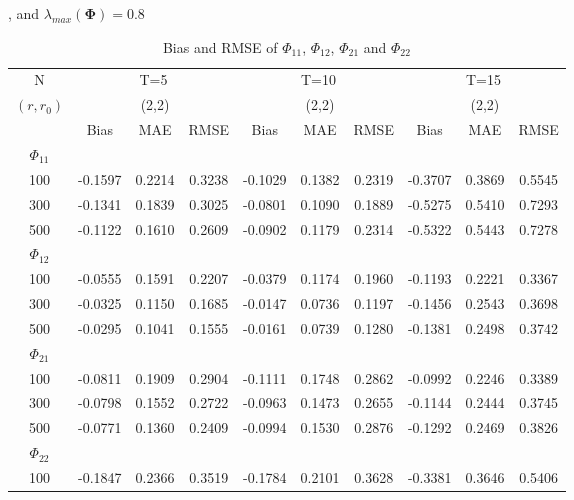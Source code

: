 \documentclass[12pt,a4paper,hyperref]{article}
\begin{document}
\begin{table}[H]
\caption{Bias and RMSE of $\Phi_{11}$, $\Phi_{12}$, $\Phi_{21}$ and $\Phi_{22}$} , and $\lambda_{max}(\boldsymbol{\Phi})=0.8$    \label{table1}
\centering
\tabcolsep=0.11cm
\begin{threeparttable}
\begin{tabular} {*{10}{c}}
\toprule
N& \multicolumn{3}{c}{T=5}&\multicolumn{3}{c}{T=10}&\multicolumn{3}{c}{T=15}\\
\cmidrule(lr){1-10}
$(r,r_{0})$ &   &(2,2)  &  &   &(2,2)  & &  &(2,2) & \\
\cmidrule(lr){1-4} \cmidrule(lr){5-7}\cmidrule(lr){8-10}
& \multicolumn{1}{c}{Bias} &\multicolumn{1}{c}{MAE}& \multicolumn{1}{c}{RMSE}&\multicolumn{1}{c}{Bias} &\multicolumn{1}{c}{MAE}& \multicolumn{1}{c}{RMSE}&\multicolumn{1}{c}{Bias}&\multicolumn{1}{c}{MAE} & \multicolumn{1}{c}{RMSE}\\
  \cmidrule(lr){2-4} \cmidrule(lr){5-7} \cmidrule(lr){8-10}
 $\Phi_{11}$\\
\cmidrule(lr){1-10}
 100& -0.1597& 0.2214& 0.3238&	-0.1029  &	0.1382& 0.2319& -0.3707&0.3869& 0.5545 \\
300& -0.1341& 0.1839& 0.3025&-0.0801	  &0.1090	&0.1889& -0.5275& 0.5410& 0.7293 \\
500& -0.1122& 0.1610&  0.2609&	-0.0902 &0.1179	&0.2314 &-0.5322 &0.5443 &0.7278	  \\
\cmidrule(lr){1-10}
$\Phi_{12}$\\
\cmidrule(lr){1-4}   \cmidrule(lr){5-7}   \cmidrule(lr){8-10}
  100& -0.0555 & 0.1591&0.2207 &-0.0379 &	0.1174&0.1960 & -0.1193& 0.2221& 0.3367  \\
300&  -0.0325& 0.1150&0.1685&	-0.0147 &0.0736	&0.1197	&-0.1456& 0.2543& 0.3698\\
500&-0.0295& 0.1041& 0.1555  &	-0.0161  &0.0739	& 0.1280&-0.1381 &0.2498 &	0.3742  \\
\cmidrule(lr){1-10}
$\Phi_{21}$\\
\cmidrule(lr){1-4}   \cmidrule(lr){5-7}   \cmidrule(lr){8-10}
 100&-0.0811 &0.1909& 0.2904&	-0.1111 &	0.1748& 0.2862& -0.0992& 0.2246&0.3389  \\
300& -0.0798  & 0.1552 &0.2722&	-0.0963 &	0.1473&	0.2655& -0.1144&0.2444 & 0.3745\\
500& -0.0771& 0.1360& 0.2409 &	-0.0994 &0.1530&0.2876 &-0.1292 &0.2469 &	0.3826 \\
\cmidrule(lr){1-10}
$\Phi_{22}$\\
\cmidrule(lr){1-4}   \cmidrule(lr){5-7}   \cmidrule(lr){8-10}
 100& -0.1847 & 0.2366&0.3519 &	 -0.1784&0.2101	& 0.3628& -0.3381& 0.3646& 0.5406  \\

\end{tabular}
\end{threeparttable}
\end{table}
\end{document}
